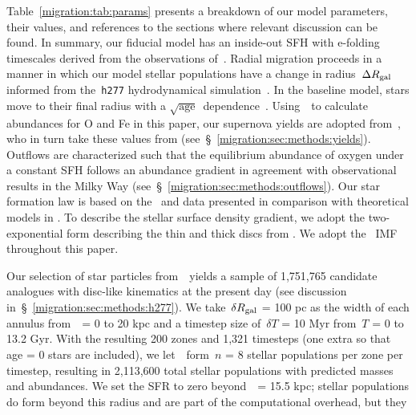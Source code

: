 Table~\ref{migration:tab:params} presents a breakdown of our model parameters, their 
values, and references to the sections where relevant discussion can be found. 
In summary, our fiducial model has an inside-out SFH with e-folding timescales 
derived from the observations of~\citet[][see discussion 
in~\S~\ref{migration:sec:methods:sfhs}]{Sanchez2020}. 
Radial migration proceeds in a manner in which our model stellar populations 
have a change in radius~$\Delta R_\text{gal}$ informed from the~\texttt{h277} 
hydrodynamical simulation~\citep[][see discussion 
in~\S~\ref{migration:sec:methods:h277}]{Christensen2012, Zolotov2012, Loebman2012, 
Loebman2014, Brooks2014}. 
In the baseline model, stars move to their final radius with a 
$\sqrt{\text{age}}$~dependence~\citep[][see discussion in 
\ref{migration:sec:methods:migration}]{Frankel2018,Frankel2020}. 
Using~\vice~to calculate abundances for O and Fe in this paper, our supernova 
yields are adopted from~\citet{Johnson2020}, who in turn take these values from 
\citet{Weinberg2017b} (see~\S~\ref{migration:sec:methods:yields}). 
Outflows are characterized such that the equilibrium abundance of oxygen under 
a constant SFH follows an abundance gradient in agreement with observational 
results in the Milky Way (see~\S~\ref{migration:sec:methods:outflows}). 
Our star formation law is based on the~\citet{Bigiel2010} and 
\citet{Leroy2013} data presented in comparison with theoretical models in 
\citet[][see~\S~\ref{migration:sec:methods:sfe}]{Krumholz2018a}. 
To describe the stellar surface density gradient, we adopt the two-exponential 
form describing the thin and thick discs from 
\citet[][see~\S~\ref{migration:sec:methods:surface_density_gradient}]{Bland-Hawthorn2016}. 
We adopt the~\citet{Kroupa2001} IMF throughout this paper. 
\par 
Our selection of star particles from~\hsim~yields a sample of 1,751,765 
candidate analogues with disc-like kinematics at the present day (see 
discussion in~\S~\ref{migration:sec:methods:h277}). 
We take~$\delta R_\text{gal}$ = 100 pc as the width of each annulus from~\rgal~= 0 to 
20 kpc and a timestep size of~$\delta T$ = 10 Myr from~$T$ = 0 to 13.2 Gyr. 
With the resulting 200 zones and 1,321 timesteps (one extra so that age = 0 
stars are included), we let~\vice~form~$n$ = 8 stellar populations per zone per 
timestep, resulting in 2,113,600 total stellar populations with predicted 
masses and abundances. 
We set the SFR to zero beyond~\rgal~= 15.5 kpc; stellar populations 
do form beyond this radius and are part of the computational overhead, but they 
